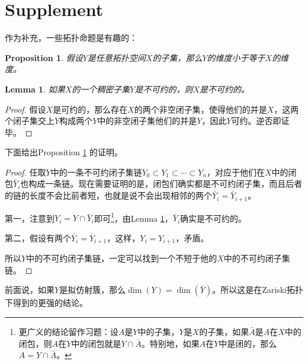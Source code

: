 \documentclass[9pt]{extarticle}
\theoremstyle{plain}%
\newtheorem{pro}[defi]{Proposition}%
\newtheorem{lem}[defi]{Lemma}%
\begin{document}
\section*{Supplement}
作为补充，一些拓扑命题是有趣的：
\begin{pro}
	假设$Y$是任意拓扑空间$X$的子集，那么$Y$的维度小于等于$X$的维度。
	\label{p1.8}
\end{pro}

\begin{lem}如果$X$的一个稠密子集$Y$是不可约的，则$X$是不可约的。
\label{l1.1}
\end{lem}
\begin{proof}
假设$X$是可约的，那么存在$X$的两个非空闭子集，使得他们的并是$X$，这两个闭子集交上$Y$构成两个$Y$中的非空闭子集他们的并是$Y$，因此$Y$可约。逆否即证毕。
\end{proof}

下面给出Proposition \ref{p1.8} 的证明。
\begin{proof}
任取$Y$中的一条不可约闭子集链$Y_0\subset Y_1\subset \cdots \subset Y_n$，对应于他们在$X$中的闭包$\bar{Y}_i$也构成一条链。现在需要证明的是，闭包们确实都是不可约闭子集，而且后者的链的长度不会比前者短，也就是说不会出现相邻的两个$\bar{Y}_i=\bar{Y}_{i+1}$。

第一，注意到$Y_i=Y\cap \bar{Y}_i$即可\footnote{更广义的结论留作习题：设$A$是$Y$中的子集，$Y$是$X$的子集，如果$\bar{A}$是$A$在$X$中的闭包，则$A$在$Y$中的闭包就是$Y\cap \bar{A}$。特别地，如果$A$在$Y$中是闭的，那么$A=Y\cap \bar{A}$。}，由Lemma \ref{l1.1}，$\bar{Y}_i$确实是不可约的。

第二，假设有两个$\bar{Y}_i=\bar{Y}_{i+1}$，这样，$Y_i=Y_{i+1}$，矛盾。

所以$Y$中的不可约闭子集链，一定可以找到一个不短于他的$X$中的不可约闭子集链。
\end{proof}

前面说，如果$Y$是拟仿射簇，那么$\dim(Y)=\dim(\bar{Y})$。所以这是在Zariski拓扑下得到的更强的结论。
\end{document}
